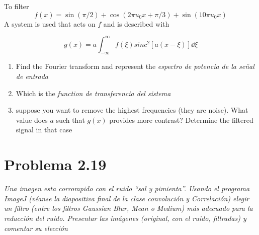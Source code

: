\documentclass[../main/main.tex]{subfiles}
\begin{document}
To filter
\begin{equation*}
	f(x) = \sin(\pi/2) + \cos(2\pi u_{0}x + \pi/3) + \sin(10\pi u_{0} x)
\end{equation*}
A system is used that acts on $f$ and is described with

\begin{equation*}
	g(x) = a \int_{-\infty}^{\infty} %
	f(\xi) sinc^{2}\left[a(x - \xi)\right]\dd{\xi}
\end{equation*}

\begin{enumerate}
	\item Find the Fourier transform and represent the \emph{espectro de potencia de la señal de entrada}
	\item Which is the \emph{function de transferencia del sistema}
	\item suppose you want to remove the highest frequencies (they are noise). What value does $a$ such that $g(x)$ provides more contrast? Determine the filtered signal in that case

\end{enumerate}

\section*{Problema 2.19}

\emph{Una imagen esta corrompido con el ruido ``sal y pimienta''. Usando el programa ImageJ (véanse la diapositiva final de la clase convolución y Correlación) elegir un filtro (entre los filtros Gaussian Blur, Mean o Medium) más adecuado para la reducción del ruido. Presentar las imágenes (original, con el ruido, filtradas) y comentar su elección}
\end{document}
